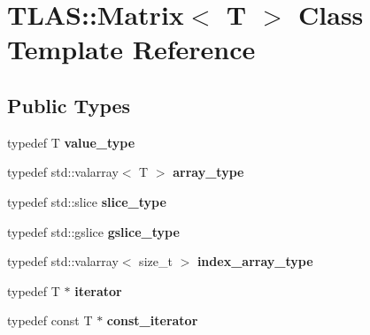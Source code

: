 \hypertarget{classTLAS_1_1Matrix}{}\section{T\+L\+AS\+:\+:Matrix$<$ T $>$ Class Template Reference}
\label{classTLAS_1_1Matrix}
\subsection*{Public Types}
\begin{DoxyCompactItemize}
\item 
\mbox{\label{classTLAS_1_1Matrix_ace2c6c66b72304c9ca09970a371541e0}} 
typedef T {\bfseries value\+\_\+type}
\item 
\mbox{\label{classTLAS_1_1Matrix_a2249a5b1d8e5c7b4e59df1ea8868aa6a}} 
typedef std\+::valarray$<$ T $>$ {\bfseries array\+\_\+type}
\item 
\mbox{\label{classTLAS_1_1Matrix_a07ee28c93347b7b9819d9632074adae8}} 
typedef std\+::slice {\bfseries slice\+\_\+type}
\item 
\mbox{\label{classTLAS_1_1Matrix_ab44ad8b938091852abdb38c44f4aad0b}} 
typedef std\+::gslice {\bfseries gslice\+\_\+type}
\item 
\mbox{\label{classTLAS_1_1Matrix_a0a394f95f6ccc26e95b4cbf961f9b014}} 
typedef std\+::valarray$<$ size\+\_\+t $>$ {\bfseries index\+\_\+array\+\_\+type}
\item 
\mbox{\label{classTLAS_1_1Matrix_a3d6287e3761c0fedbc58f14a9bcf9c5f}} 
typedef T $\ast$ {\bfseries iterator}
\item 
\mbox{\label{classTLAS_1_1Matrix_a5c445d631a032bfc93a8e130fdf8abff}} 
typedef const T $\ast$ {\bfseries const\+\_\+iterator}
\end{DoxyCompactItemize}
